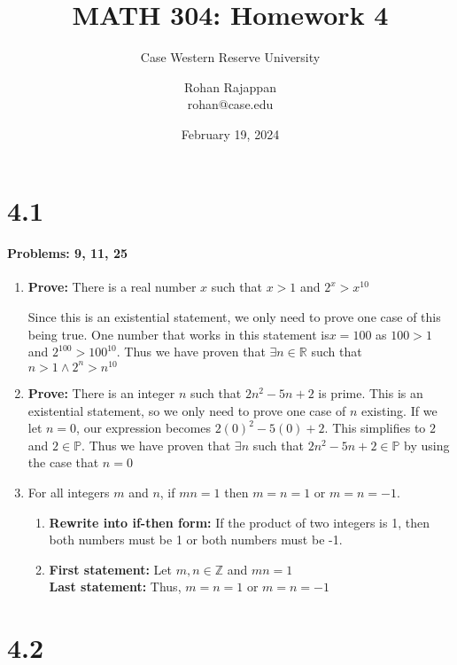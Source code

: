 \documentclass{article}
\title{MATH 304: Homework 4}
\subtitle{Case Western Reserve University}
\author{Rohan Rajappan \\rohan@case.edu}
\date{February 19, 2024}
\makeatletter
\newcommand\setItemnumber[1]{\setcounter{enum\romannumeral\@enumdepth}{\numexpr#1-1\relax}}
\makeatother
\begin{document}
\maketitle

\section{4.1}
 \paragraph{Problems: 9, 11, 25}
 \begin{enumerate}
     \setItemnumber{9}
     \item \textbf{Prove:} There is a real number $x$ such that $x>1$ and $2^x > x^{10}$

     Since this is an existential statement, we only need to prove one case of this being true. One number that works in this statement is$x=100$ as $100>1$ and $2^{100}>100^{10}$. Thus we have proven that $\exists n \in \mathbb{R}$ such that $n>1 \land 2^n>n^{10}$
     \setItemnumber{11}
     \item \textbf{Prove:} There is an integer $n$ such that $2n^2-5n+2$ is prime. This is an existential statement, so we only need to prove one case of $n$ existing. If we let $n=0$, our expression becomes $2(0)^2-5(0)+2$. This simplifies to $2$ and $2\in\mathbb{P}$. Thus we have proven that $\exists n$ such that $2n^2-5n+2 \in \mathbb{P}$ by using the case that $n=0$

     \setItemnumber{25}
     \item For all integers $m$ and $n$, if $mn=1$ then $m=n=1$ or $m=n=-1$.
     \begin{enumerate}
         \item \textbf{Rewrite into if-then form:} If the product of two integers is 1, then both numbers must be 1 or both numbers must be -1.
         \item \textbf{First statement:} Let $m, n \in\mathbb{Z}$ and $mn=1$ \\
         \textbf{Last statement:} Thus, $m=n=1$ or $m=n=-1$
     \end{enumerate}
 \end{enumerate}
 
  
\section{4.2}
\end{document}
